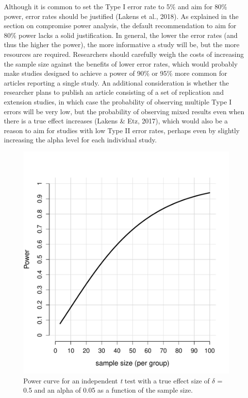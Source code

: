\documentclass[
  english,
  ,jou, a4paper,floatsintext]{apa6}
\begin{document}
Although it is common to set the Type I error rate to 5\% and aim for 80\% power, error rates should be justified (Lakens et al., 2018). As explained in the section on compromise power analysis, the default recommendation to aim for 80\% power lacks a solid justification. In general, the lower the error rates (and thus the higher the power), the more informative a study will be, but the more resources are required. Researchers should carefully weigh the costs of increasing the sample size against the benefits of lower error rates, which would probably make studies designed to achieve a power of 90\% or 95\% more common for articles reporting a single study. An additional consideration is whether the researcher plans to publish an article consisting of a set of replication and extension studies, in which case the probability of observing multiple Type I errors will be very low, but the probability of observing mixed results even when there is a true effect increases (Lakens \& Etz, 2017), which would also be a reason to aim for studies with low Type II error rates, perhaps even by slightly increasing the alpha level for each individual study.

\begin{figure}
\centering
\includegraphics{sample_size_justification_files/figure-latex/power-2-1.pdf}
\caption{\label{fig:power-2}Power curve for an independent \emph{t} test with a true effect size of \(\delta\) = 0.5 and an alpha of 0.05 as a function of the sample size.}
\end{figure}
\end{document}
